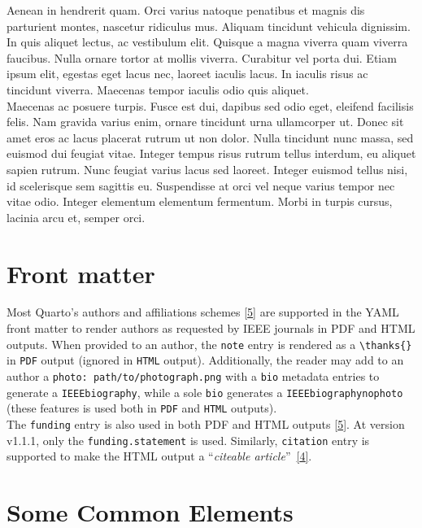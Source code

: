 \documentclass[
  journal,
]{IEEEtran}%
\theoremstyle{plain}
\theoremstyle{remark}
\begin{document}
Aenean in hendrerit quam. Orci varius natoque penatibus et magnis dis
parturient montes, nascetur ridiculus mus. Aliquam tincidunt vehicula
dignissim. In quis aliquet lectus, ac vestibulum elit. Quisque a magna
viverra quam viverra faucibus. Nulla ornare tortor at mollis viverra.
Curabitur vel porta dui. Etiam ipsum elit, egestas eget lacus nec,
laoreet iaculis lacus. In iaculis risus ac tincidunt viverra. Maecenas
tempor iaculis odio quis aliquet.\\
Maecenas ac posuere turpis. Fusce est dui, dapibus sed odio eget,
eleifend facilisis felis. Nam gravida varius enim, ornare tincidunt urna
ullamcorper ut. Donec sit amet eros ac lacus placerat rutrum ut non
dolor. Nulla tincidunt nunc massa, sed euismod dui feugiat vitae.
Integer tempus risus rutrum tellus interdum, eu aliquet sapien rutrum.
Nunc feugiat varius lacus sed laoreet. Integer euismod tellus nisi, id
scelerisque sem sagittis eu. Suspendisse at orci vel neque varius tempor
nec vitae odio. Integer elementum elementum fermentum. Morbi in turpis
cursus, lacinia arcu et, semper orci.

\hypertarget{front-matter}{%
\section{Front matter}\label{front-matter}}

Most Quarto's authors and affiliations schemes
\protect\hyperlink{ref-quarto-funding}{{[}5{]}} are supported in the
YAML front matter to render authors as requested by IEEE journals in PDF
and HTML outputs. When provided to an author, the \texttt{note} entry is
rendered as a \texttt{\textbackslash{}thanks\{\}} in \texttt{PDF} output
(ignored in \texttt{HTML} output). Additionally, the reader may add to
an author a \texttt{photo:\ path/to/photograph.png} with a \texttt{bio}
metadata entries to generate a \texttt{IEEEbiography}, while a sole
\texttt{bio} generates a \texttt{IEEEbiographynophoto} (these features
is used both in \texttt{PDF} and \texttt{HTML} outputs).\\
The \texttt{funding} entry is also used in both PDF and HTML outputs
\protect\hyperlink{ref-quarto-funding}{{[}5{]}}. At version v1.1.1, only
the \texttt{funding.statement} is used. Similarly, \texttt{citation}
entry is supported to make the HTML output a ``\emph{citeable
article}''~\protect\hyperlink{ref-quarto-citation}{{[}4{]}}.

\hypertarget{some-common-elements}{%
\section{Some Common Elements}\label{some-common-elements}}
\end{document}
